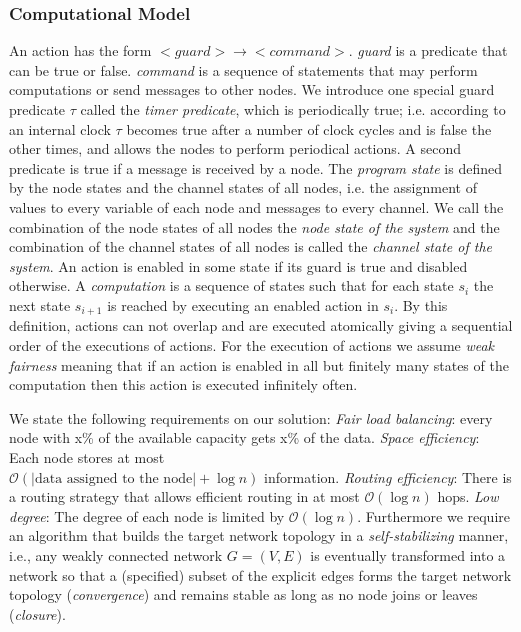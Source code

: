 \documentclass[11pt]{article}
\begin{document}
\subsubsection{Computational Model}
An action has the form $<guard>\rightarrow <command>$. \emph{guard} is a
predicate that can be true or false. \emph{command} is a sequence of
statements that may perform computations or send messages to other nodes. We
introduce one special guard predicate $\tau$ called the \emph{timer
predicate}, which is periodically true; i.e. according to an internal clock $\tau$ becomes true after a number of clock cycles and is false  the other times,  and allows the nodes to perform
periodical actions. A second predicate is true if a message is received by a
node.
The \emph{program state} is defined by the node states and the channel
states of all nodes, i.e. the assignment of values to every variable of each
node and messages to every channel. We call the combination of the node
states of all nodes the \emph{node state of the system} and the combination
of the channel states of all nodes is called the \emph{channel state of the
system}.
An action is enabled in some state if its guard is true and disabled
otherwise.
A \emph{computation} is a sequence of states such that for each state $s_i$
the next state $s_{i+1}$ is reached by executing an enabled action in $s_i$.
By this definition, actions can not overlap and are executed atomically
giving a sequential order of the executions of actions. For the execution of
actions we assume \emph{weak fairness} meaning that if an action is enabled
in all but finitely many states of the computation then this action is
executed infinitely often.

We state the following requirements on our solution: \emph{Fair load
balancing}: every node with x\% of the available capacity gets x\% of the
data. \emph{Space efficiency}: Each node stores at most\\ $\mathcal
O(|\text{data assigned to the node}| + \log n)$ information. \emph{Routing
efficiency}: There is a routing strategy that allows efficient routing in at
most $\mathcal O(\log n)$ hops. \emph{Low degree}: The degree of each node is
limited by $\mathcal O(\log n)$. Furthermore we require an algorithm that
builds the target network topology in a \emph{self-stabilizing} manner, i.e.,
any weakly connected network $G=(V,E)$ is eventually transformed into a
network so that a (specified) subset of the explicit edges forms the target
network topology ({\em convergence}) and remains stable as long as no node
joins or leaves ({\em closure}).
\end{document}
